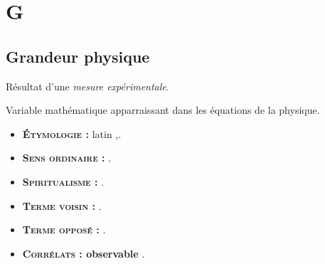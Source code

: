\chapter{G}
\section{Grandeur physique}

Résultat d'une {\it mesure expérimentale}.

Variable mathématique apparraissant dans les équations de la physique.

{\footnotesize
\begin{itemize}[leftmargin=1cm, label=, itemsep=1pt]
\item {\bf \textsc{Étymologie} :} latin {\it },.
\item {\bf \textsc{Sens ordinaire} :} .
\item {\bf \textsc{Spiritualisme} :} .
\end{itemize}

\begin{itemize}[leftmargin=1cm, label=, itemsep=1pt]
\item {\bf \textsc{Terme voisin} :} .
\item {\bf \textsc{Terme opposé} :} .
\item {\bf \textsc{Corrélats} : observable} .
\end{itemize}
}
